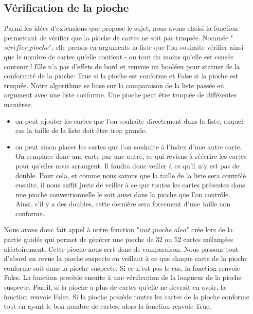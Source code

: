 \documentclass[10pt,a4paper,french,titlepage]{article}
\begin{document}
\subsection{Vérification de la pioche}
Parmi les idées d'extensions que propose le sujet, nous avons choisi la fonction permettant de vérifier que la pioche de cartes ne soit pas truquée. Nommée "$vérifier\_pioche$", elle prends en arguments la liste que l'on souhaite vérifier ainsi que le nombre de cartes qu'elle contient - ou tout du moins qu'elle est censée contenir ! Elle n'a pas d'effets de bord et renvoie un booléen pour statuer de la conformité de la pioche: True si la pioche est conforme et False si la pioche est truquée. Notre algorithme se base sur la comparaison de la liste passée en argument avec une liste conforme. Une pioche peut être truquée de différentes manières:
\begin{itemize}
\item on peut ajouter les cartes que l'on souhaite directement dans la liste, auquel cas la taille de la liste doit être trop grande.
\item on peut sinon placer les cartes que l'on souhaite à l'index d'une autre carte. On remplace donc une carte par une autre, ce qui reviens à réécrire les cartes pour qu'elles nous arrangent. Il faudra donc veiller à ce qu'il n'y est pas de double. Pour cela, et comme nous savons que la taille de la liste sera contrôlé ensuite, il nous suffit juste de veiller à ce que toutes les cartes présentes dans une pioche conventionnelle le soit aussi dans la pioche que l'on contrôle. Ainsi, s'il y a des doubles, cette dernière sera forcement d'une taille non conforme.
\end{itemize}

Nous avons donc fait appel à notre fonction "$init\_pioche\_alea$" crée lors de la partie guidée qui permet de générer une pioche de 32 ou 52 cartes mélangées aléatoirement\label{piochealea}. Cette pioche nous sert donc de comparaison. Nous passons tout d'abord en revue la pioche suspecte en veillant à ce que chaque carte de la pioche conforme soit dans la pioche suspecte. Si ce n'est pas le cas, la fonction renvoie False. La fonction procède ensuite à une vérification de la longueur de la pioche suspecte. Pareil, si la pioche a plus de cartes qu'elle ne devrait en avoir, la fonction renvoie False. Si la pioche possède toutes les cartes de la pioche conforme tout en ayant le bon nombre de cartes, alors la fonction renvoie True.
\end{document}

